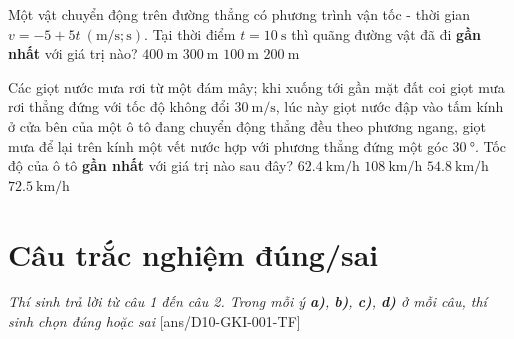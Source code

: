 \begin{ex}
	Một vật chuyển động trên đường thẳng có phương trình vận tốc - thời gian $v=-5+5t\ \left(\si{\meter/\second};\si{\second}\right)$. Tại thời điểm $t=\SI{10}{\second}$ thì quãng đường vật đã đi \textbf{gần nhất} với giá trị nào?
	\choice
	{$\SI{400}{\meter}$}
	{$\SI{300}{\meter}$}
	{$\SI{100}{\meter}$}
	{\True $\SI{200}{\meter}$}
\end{ex}


\begin{ex}
	Các giọt nước mưa rơi từ một đám mây; khi xuống tới gần mặt đất	coi giọt mưa rơi thẳng đứng với tốc độ không đổi $\SI{30}{\meter/\second}$, lúc này giọt nước đập vào tấm kính ở cửa bên của một ô tô đang chuyển động thẳng đều theo phương ngang, giọt mưa để lại trên kính một vết nước hợp với phương thẳng đứng một góc $\SI{30}{\degree}$. Tốc độ của ô tô \textbf{gần nhất} với giá trị nào sau đây?
	\choice
	{\True $\SI{62.4}{\kilo\meter/\hour}$}
	{$\SI{108}{\kilo\meter/\hour}$}
	{$\SI{54.8}{\kilo\meter/\hour}$}
	{$\SI{72.5}{\kilo\meter/\hour}$}
\end{ex}


\section{Câu trắc nghiệm đúng/sai} 
\textit{Thí sinh trả lời từ câu 1 đến câu 2. Trong mỗi ý \textbf{a)}, \textbf{b)}, \textbf{c)}, \textbf{d)} ở mỗi câu, thí sinh chọn đúng hoặc sai}
\setcounter{ex}{0}
[ans/D10-GKI-001-TF]

